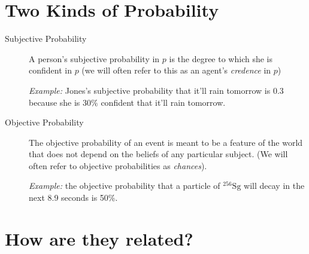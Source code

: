 \documentclass[12pt]{extarticle}
\begin{document}

\vspace{-3em} 

\section{Two Kinds of Probability}

\label{probability-subjective-and-objective}


\begin{description}

\item[Subjective Probability] A person's subjective probability in $p$ is the degree to which she is confident in $p$ (we will often refer to this as an agent's \textit{credence} in $p$)

\emph{Example:} Jones's subjective probability that it'll rain tomorrow is 0.3 because she is $30\%$ confident that it'll rain tomorrow.

\item[Objective Probability] The objective probability of an event is meant to be a feature of the world that does not depend on the beliefs of any particular subject. (We will often refer to objective probabilities as \textit{chances}). 

\emph{Example:} the objective probability that a particle of $^{256}\mbox{Sg}$ will decay in the next 8.9 seconds is 50\%.

\end{description}


\section{How are they related?}
\end{document}
